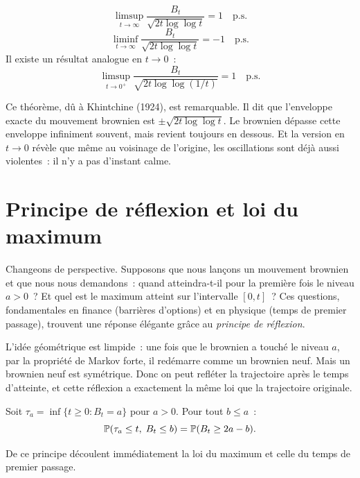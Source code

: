 \begin{theoreme}
\label{thm:LIL}
\[
  \limsup_{t \to \infty} \frac{B_t}{\sqrt{2t \log \log t}} = 1 \quad \text{p.s.}
\]
\[
  \liminf_{t \to \infty} \frac{B_t}{\sqrt{2t \log \log t}} = -1 \quad \text{p.s.}
\]
Il existe un r\'esultat analogue en $t \to 0$~:
\[
  \limsup_{t \to 0^+} \frac{B_t}{\sqrt{2t \log \log(1/t)}} = 1 \quad \text{p.s.}
\]
\end{theoreme}

Ce th\'eor\`eme, d\^u \`a Khintchine (1924), est remarquable. Il dit que
l'enveloppe exacte du mouvement brownien est $\pm\sqrt{2t \log \log t}$.
Le brownien d\'epasse cette enveloppe infiniment souvent, mais revient
toujours en dessous. Et la version en $t \to 0$ r\'ev\`ele que m\^eme au
voisinage de l'origine, les oscillations sont d\'ej\`a aussi violentes~: il
n'y a pas d'\og instant calme\fg.

\section{Principe de r\'eflexion et loi du maximum}

Changeons de perspective. Supposons que nous lan\c{c}ons un mouvement brownien
et que nous nous demandons~: quand atteindra-t-il pour la premi\`ere fois le
niveau $a > 0$~? Et quel est le maximum atteint sur l'intervalle $[0, t]$~?
Ces questions, fondamentales en finance (barri\`eres d'options) et en
physique (temps de premier passage), trouvent une r\'eponse \'el\'egante
gr\^ace au \emph{principe de r\'eflexion}.

L'id\'ee g\'eom\'etrique est limpide~: une fois que le brownien a touch\'e le
niveau $a$, par la propri\'et\'e de Markov forte, il red\'emarre comme un
brownien neuf. Mais un brownien neuf est sym\'etrique. Donc on peut
\og refl\'eter\fg{} la trajectoire apr\`es le temps d'atteinte, et cette
r\'eflexion a exactement la m\^eme loi que la trajectoire originale.

\begin{theoreme}
\label{thm:reflexion}
Soit $\tau_a = \inf\{t \geq 0 : B_t = a\}$ pour $a > 0$. Pour tout $b \leq a$~:
\[
  \mathbb{P}(\tau_a \leq t,\; B_t \leq b) = \mathbb{P}(B_t \geq 2a - b).
\]
\end{theoreme}

De ce principe d\'ecoulent imm\'ediatement la loi du maximum et celle du
temps de premier passage.

